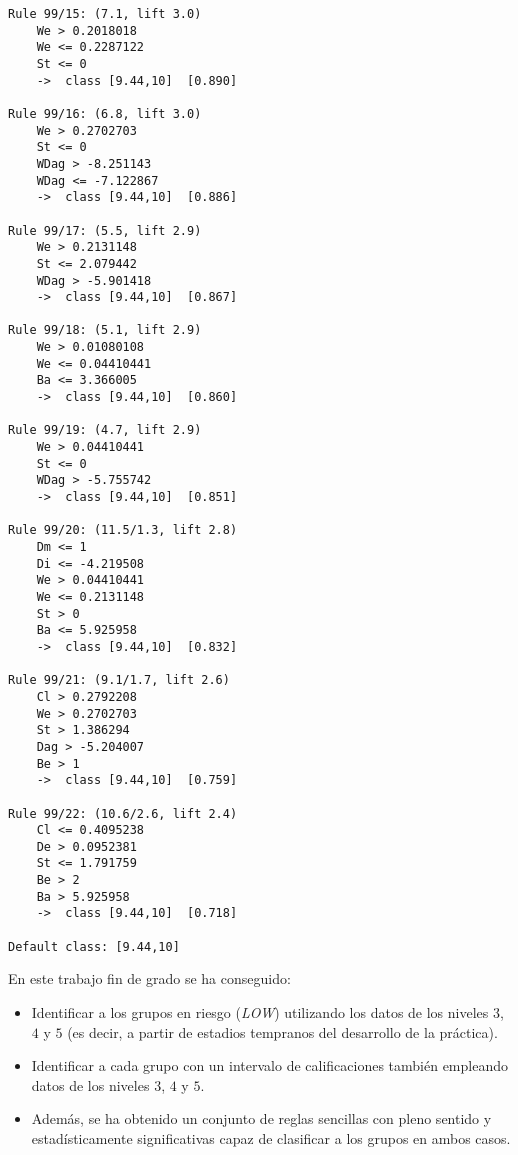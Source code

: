 \begin{tcolorbox}[title=Reglas de clasificación para identificar intervalos de notas.]
\begin{multicols}{3}
\begin{verbatim}
Rule 99/15: (7.1, lift 3.0)
	We > 0.2018018
	We <= 0.2287122
	St <= 0
	->  class [9.44,10]  [0.890]

Rule 99/16: (6.8, lift 3.0)
	We > 0.2702703
	St <= 0
	WDag > -8.251143
	WDag <= -7.122867
	->  class [9.44,10]  [0.886]

Rule 99/17: (5.5, lift 2.9)
	We > 0.2131148
	St <= 2.079442
	WDag > -5.901418
	->  class [9.44,10]  [0.867]

Rule 99/18: (5.1, lift 2.9)
	We > 0.01080108
	We <= 0.04410441
	Ba <= 3.366005
	->  class [9.44,10]  [0.860]

Rule 99/19: (4.7, lift 2.9)
	We > 0.04410441
	St <= 0
	WDag > -5.755742
	->  class [9.44,10]  [0.851]

Rule 99/20: (11.5/1.3, lift 2.8)
	Dm <= 1
	Di <= -4.219508
	We > 0.04410441
	We <= 0.2131148
	St > 0
	Ba <= 5.925958
	->  class [9.44,10]  [0.832]

Rule 99/21: (9.1/1.7, lift 2.6)
	Cl > 0.2792208
	We > 0.2702703
	St > 1.386294
	Dag > -5.204007
	Be > 1
	->  class [9.44,10]  [0.759]

Rule 99/22: (10.6/2.6, lift 2.4)
	Cl <= 0.4095238
	De > 0.0952381
	St <= 1.791759
	Be > 2
	Ba > 5.925958
	->  class [9.44,10]  [0.718]

Default class: [9.44,10]
    \end{verbatim}
  \end{multicols}
\end{tcolorbox}

\begin{tcolorbox}[colframe=blue!80, title=Resumen de los resultados obtenidos]
En este trabajo fin de grado se ha conseguido:
\begin{itemize}
\item Identificar a los grupos en riesgo (\emph{LOW}) utilizando los datos de los niveles $3$, $4$ y $5$ (es decir, a partir de estadios tempranos del desarrollo de la práctica).
\item Identificar a cada grupo con un intervalo de calificaciones también empleando datos de los niveles $3$, $4$ y $5$.
\item Además, se ha obtenido un conjunto de reglas sencillas con pleno sentido y estadísticamente significativas capaz de clasificar a los grupos en ambos casos.
\end{itemize}
\end{tcolorbox}